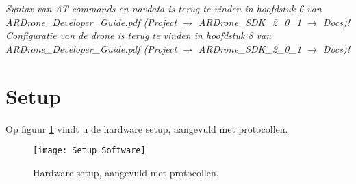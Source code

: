 \textit{Syntax van AT commands en navdata is terug te vinden in hoofdstuk 6 van ARDrone\_Developer\_Guide.pdf (Project $\to$ ARDrone\_SDK\_2\_0\_1 $\to$ Docs)!}\\
\textit{Configuratie van de drone is terug te vinden in hoofdstuk 8 van ARDrone\_Developer\_Guide.pdf (Project $\to$ ARDrone\_SDK\_2\_0\_1 $\to$ Docs)!}

\section{Setup} \label{sec:setup_software}
Op figuur \ref{fig:setup_software} vindt u de hardware setup, aangevuld met protocollen.
\begin{figure}[p]
	\centering
	\texttt{[image: Setup\_Software]}
	\caption[Hardware setup, aangevuld met protocollen]{Hardware setup, aangevuld met protocollen.}
	\label{fig:setup_software}
\end{figure}